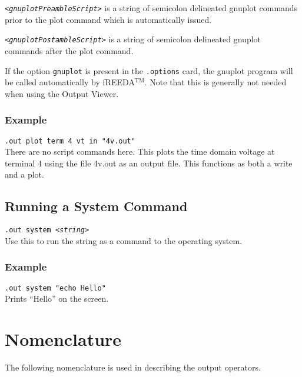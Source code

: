 {\tt<{\it gnuplotPreambleScript}>} is a string of semicolon delineated
gnuplot commands prior to the plot command which is automatically
issued.

{\tt<{\it gnuplotPostambleScript}>} is a string of semicolon delineated
gnuplot commands after the plot command.

If the option {\tt gnuplot} is present in the {\tt .options} card, the
gnuplot program will be called automatically by fREEDA$^{\mathrm{TM}}$. Note that
this is generally not needed when using the Output Viewer.


\subsubsection{Example}

{\tt .out plot term 4 vt in "4v.out"} \medskip
\\
There are no script commands here. This plots the time domain voltage
at terminal 4 using the file 4v.out as an output file. This functions
as both a write and a plot.

\subsection{Running a System Command}

{\tt .out system <{\it string}>} \medskip
\\
Use this to run the string as a command to the operating system.

\subsubsection{Example}

{\tt .out system "echo Hello"} \medskip
\\
Prints ``Hello'' on the screen.

\section{Nomenclature}

The following nomenclature is used in describing the output operators.

